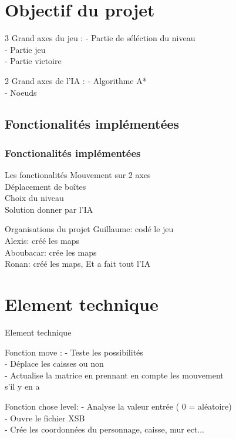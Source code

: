 \documentclass{beamer}
\begin{document}
\section{Objectif du projet}
\begin{frame}
\begin{block}{3 Grand axes du jeu :}
- Partie de séléction du niveau \\ 
- Partie jeu  \\
- Partie victoire \\
\end{block}
\begin{block}{2 Grand axes de l'IA :}
- Algorithme A* \\ 
- Noeuds \\
\end{block}
\end{frame}


\begin{frame}
\section{Fonctionalités implémentées}
\frametitle{Fonctionalités implémentées}
\begin{block}{Les fonctionalités}
Mouvement sur 2 axes \\
Déplacement de boîtes \\
Choix du niveau \\
Solution donner par l'IA
\end{block}
\begin{block}{Organisations du projet}
Guillaume: codé le jeu \\ 
Alexis: créé les maps \\
Aboubacar: crée les maps  \\
Ronan: créé les maps, Et a fait tout l'IA
\end{block}
\end{frame}

\section{Element technique}
\begin{frame}{Element technique}

\begin{block}{Fonction move :} 
- Teste les possibilités \\
- Déplace les caisses ou non \\
- Actualise la matrice en prennant en compte les mouvement \\ s'il y en a \\
\end{block}
\begin{block}{Fonction chose level:} 
- Analyse la valeur entrée ( 0 = aléatoire) \\
- Ouvre le fichier XSB  \\
- Crée les coordonnées du personnage, caisse, mur ect... 
\end{block}
\end{frame}
\end{document}
